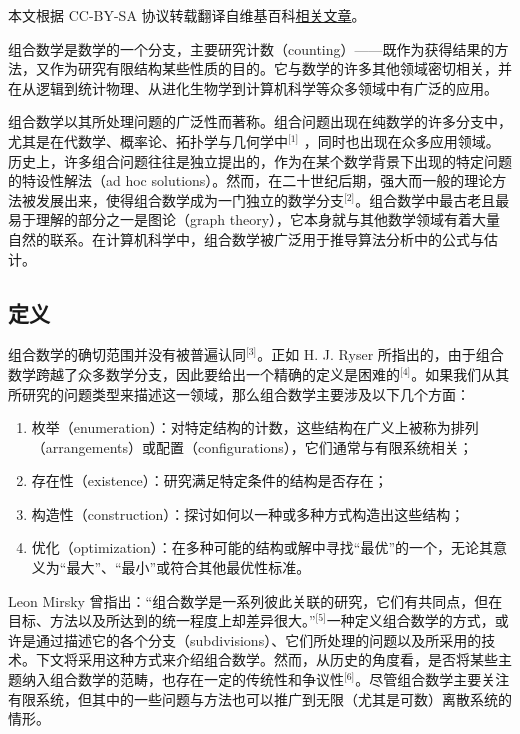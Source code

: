 
本文根据 CC-BY-SA 协议转载翻译自维基百科\href{https://en.wikipedia.org/wiki/Combinatorics}{相关文章}。

组合数学是数学的一个分支，主要研究计数（counting）——既作为获得结果的方法，又作为研究有限结构某些性质的目的。它与数学的许多其他领域密切相关，并在从逻辑到统计物理、从进化生物学到计算机科学等众多领域中有广泛的应用。

组合数学以其所处理问题的广泛性而著称。组合问题出现在纯数学的许多分支中，尤其是在代数学、概率论、拓扑学与几何学中\(^\text{[1]}\) ，同时也出现在众多应用领域。  
历史上，许多组合问题往往是独立提出的，作为在某个数学背景下出现的特定问题的特设性解法（ad hoc solutions）。然而，在二十世纪后期，强大而一般的理论方法被发展出来，使得组合数学成为一门独立的数学分支\(^\text{[2]}\)。组合数学中最古老且最易于理解的部分之一是图论（graph theory），它本身就与其他数学领域有着大量自然的联系。在计算机科学中，组合数学被广泛用于推导算法分析中的公式与估计。
\subsection{定义}
组合数学的确切范围并没有被普遍认同\(^\text{[3]}\)。正如 H. J. Ryser 所指出的，由于组合数学跨越了众多数学分支，因此要给出一个精确的定义是困难的\(^\text{[4]}\)。如果我们从其所研究的问题类型来描述这一领域，那么组合数学主要涉及以下几个方面：
\begin{enumerate}
  \item 枚举（enumeration）：对特定结构的计数，这些结构在广义上被称为排列（arrangements）或配置（configurations），它们通常与有限系统相关；
  \item 存在性（existence）：研究满足特定条件的结构是否存在；
  \item 构造性（construction）：探讨如何以一种或多种方式构造出这些结构；
  \item 优化（optimization）：在多种可能的结构或解中寻找“最优”的一个，无论其意义为“最大”、“最小”或符合其他最优性标准。
\end{enumerate}
Leon Mirsky 曾指出：“组合数学是一系列彼此关联的研究，它们有共同点，但在目标、方法以及所达到的统一程度上却差异很大。”\(^\text{[5]}\)一种定义组合数学的方式，或许是通过描述它的各个分支（subdivisions）、它们所处理的问题以及所采用的技术。下文将采用这种方式来介绍组合数学。然而，从历史的角度看，是否将某些主题纳入组合数学的范畴，也存在一定的传统性和争议性\(^\text{[6]}\)。尽管组合数学主要关注有限系统，但其中的一些问题与方法也可以推广到无限（尤其是可数）离散系统的情形。

